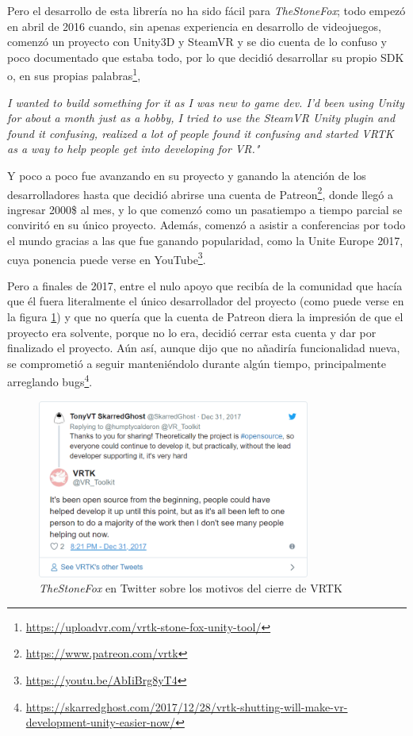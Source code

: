 Pero el desarrollo de esta librería no ha sido fácil para \textit{TheStoneFox}; todo empezó en abril de 2016 cuando, sin apenas experiencia en desarrollo de videojuegos, comenzó un proyecto con Unity3D y SteamVR y se dio cuenta de lo confuso y poco documentado que estaba todo, por lo que decidió desarrollar su propio \acs{SDK} o, en sus propias palabras\footnote{\url{https://uploadvr.com/vrtk-stone-fox-unity-tool/}},

\begin{displayquote}
\textit{I wanted to build something for it as I was new to game dev. I’d been using Unity for about a month just as a hobby, I tried to use the SteamVR Unity plugin and found it confusing, realized a lot of people found it confusing and started VRTK as a way to help people get into developing for VR."}
\end{displayquote}

Y poco a poco fue avanzando en su proyecto y ganando la atención de los desarrolladores hasta que decidió abrirse una cuenta de Patreon\footnote{\url{https://www.patreon.com/vrtk}}, donde llegó a ingresar 2000\$ al mes, y lo que comenzó como un pasatiempo a tiempo parcial se conviritó en su único proyecto. Además, comenzó a asistir a conferencias por todo el mundo gracias a las que fue ganando popularidad, como la Unite Europe 2017, cuya ponencia puede verse en YouTube\footnote{\url{https://youtu.be/AbIiBrg8yT4}}.

Pero a finales de 2017, entre el nulo apoyo que recibía de la comunidad que hacía que él fuera literalmente el único desarrollador del proyecto (como puede verse en la figura \ref{fig:stonefox-twitter}) y que no quería que la cuenta de Patreon diera la impresión de que el proyecto era solvente, porque no lo era, decidió cerrar esta cuenta y dar por finalizado el proyecto. Aún así, aunque dijo que no añadiría funcionalidad nueva, se comprometió a seguir manteniéndolo durante algún tiempo, principalmente arreglando bugs\footnote{\url{https://skarredghost.com/2017/12/28/vrtk-shutting-will-make-vr-development-unity-easier-now/}}.

\begin{figure}[!h]
\begin{center}
\includegraphics[width=0.8\textwidth]{imagenes/2/stonefox-twitter.png}
\caption{\textit{TheStoneFox} en Twitter sobre los motivos del cierre de \acs{VRTK}}
\label{fig:stonefox-twitter}
\end{center}
\end{figure}

